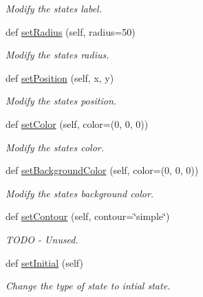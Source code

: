 \begin{DoxyCompactItemize}
\begin{DoxyCompactList}\small\item\em Modify the state\textquotesingle{}s label. \end{DoxyCompactList}\item 
def \mbox{\hyperlink{classState_1_1State_adc1a8f9b4fbb09c6c3b7f410d06adf42}{set\+Radius}} (self, radius=50)
\begin{DoxyCompactList}\small\item\em Modify the state\textquotesingle{}s radius. \end{DoxyCompactList}\item 
def \mbox{\hyperlink{classState_1_1State_ab03eca69f6193adba38e0d0c975f829a}{set\+Position}} (self, x, y)
\begin{DoxyCompactList}\small\item\em Modify the state\textquotesingle{}s position. \end{DoxyCompactList}\item 
def \mbox{\hyperlink{classState_1_1State_a9ae69a0a04376e2210c2ae2bcceb9e9f}{set\+Color}} (self, color=(0, 0, 0))
\begin{DoxyCompactList}\small\item\em Modify the state\textquotesingle{}s color. \end{DoxyCompactList}\item 
def \mbox{\hyperlink{classState_1_1State_a7777063485195d1b34fd4ba6a7848ea5}{set\+Background\+Color}} (self, color=(0, 0, 0))
\begin{DoxyCompactList}\small\item\em Modify the state\textquotesingle{}s background color. \end{DoxyCompactList}\item 
def \mbox{\hyperlink{classState_1_1State_a1957da99a57d165cd3275ffc38082293}{set\+Contour}} (self, contour=\char`\"{}simple\char`\"{})
\begin{DoxyCompactList}\small\item\em T\+O\+DO -\/ Unused. \end{DoxyCompactList}\item 
\mbox{\label{classState_1_1State_a9e41891de5049b102261bd3346edb10c}} 
def \mbox{\hyperlink{classState_1_1State_a9e41891de5049b102261bd3346edb10c}{set\+Initial}} (self)
\begin{DoxyCompactList}\small\item\em Change the type of state to intial state. \end{DoxyCompactList}\item 

\end{DoxyCompactItemize}
